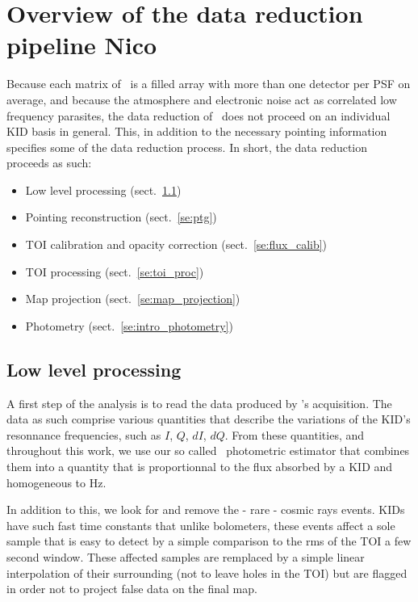

\section{Overview of the data reduction pipeline {\color{YellowGreen} Nico}}
\label{se:pipeline_overview}

Because each matrix of \nika\ is a filled array with more than one detector per
PSF on average, and because the atmosphere and electronic noise act as
correlated low frequency parasites, the data reduction of \nika\ does not
proceed on an individual KID basis in general. This, in addition to the
necessary pointing information specifies some of the data reduction
process. In short, the data reduction proceeds as such:

\begin{itemize}
\item Low level processing (sect.~\ref{se:ll_proc})
\item Pointing reconstruction (sect.~\ref{se:ptg})
\item TOI calibration and opacity correction (sect.~\ref{se:flux_calib})
\item TOI processing (sect.~\ref{se:toi_proc})
\item Map projection (sect.~\ref{se:map_projection})
\item Photometry (sect.~\ref{se:intro_photometry})
\end{itemize}

\subsection{Low level processing}
\label{se:ll_proc}

A first step of the analysis is to read the data produced by \nika's
acquisition. The data as such comprise various quantities that describe the
variations of the KID's resonnance frequencies, such as $I$, $Q$, $dI$,
$dQ$. From these quantities, and throughout this work, we use our so called
\rf\ photometric estimator that combines them into a quantity that is
proportionnal to the flux absorbed by a KID \cite{Calvo13} and homogeneous to Hz.

In addition to this, we look for and remove the - rare - cosmic rays
events. KIDs have such fast time constants that unlike bolometers, these events
affect a sole sample that is easy to detect by a simple comparison to the rms of
the TOI a few second window. These affected samples are remplaced by a simple
linear interpolation of their surrounding (not to leave holes in the TOI) but
are flagged in order not to project false data on the final map.

